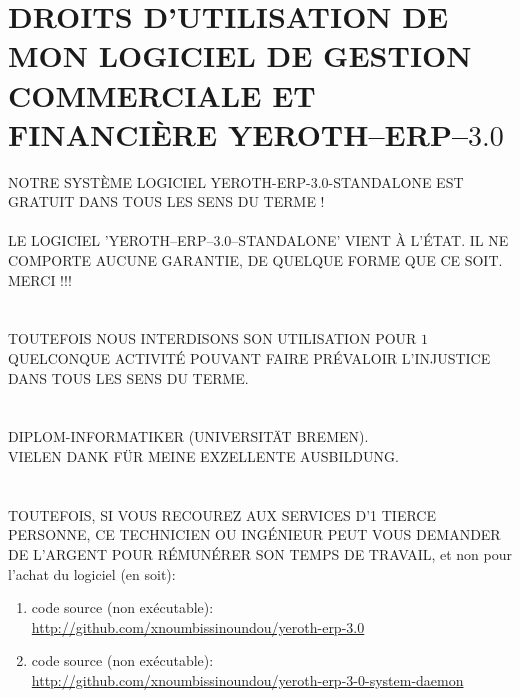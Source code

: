 \chapter{DROITS D'UTILISATION DE MON LOGICIEL DE GESTION 
  COMMERCIALE ET FINANCI\`ERE YEROTH--ERP--$3.0$}


\textcolor{yerothColorRed}{NOTRE SYST\`EME LOGICIEL
YEROTH-ERP-3.0-STANDALONE EST GRATUIT DANS TOUS LES
SENS DU TERME !\\
\\
LE LOGICIEL 'YEROTH--ERP--3.0--STANDALONE' VIENT À
L'ÉTAT. IL NE COMPORTE AUCUNE GARANTIE, DE QUELQUE
FORME QUE CE SOIT.
\\
MERCI !!!\\
\\
\\
TOUTEFOIS NOUS INTERDISONS SON UTILISATION POUR
$1$ QUELCONQUE ACTIVIT\'E POUVANT FAIRE PR\'EVALOIR
L'INJUSTICE DANS TOUS LES SENS DU TERME.\\
\\
\\
DIPLOM-INFORMATIKER (UNIVERSITÄT BREMEN).\\
VIELEN DANK FÜR MEINE EXZELLENTE AUSBILDUNG}.\\
\\
\\
TOUTEFOIS, SI VOUS RECOUREZ AUX SERVICES D'1 TIERCE
PERSONNE, CE TECHNICIEN OU ING\'ENIEUR PEUT VOUS
DEMANDER DE L'ARGENT POUR R\'EMUN\'ERER SON TEMPS DE
TRAVAIL, et non pour l'achat du logiciel (en soit):

\begin{enumerate}[1.]
	\item code source (non ex\'ecutable): \\
		{\small \url{http://github.com/xnoumbissinoundou/yeroth-erp-3.0}}
		
	\item code source (non ex\'ecutable): \\
		{\small \url{http://github.com/xnoumbissinoundou/yeroth-erp-3-0-system-daemon}}
\end{enumerate}

